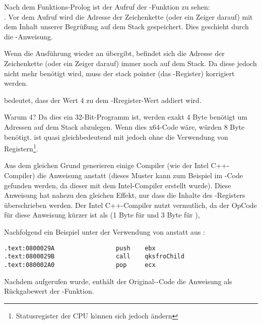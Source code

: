 Nach dem Funktions-Prolog ist der Aufruf der \printf{}-Funktion zu sehen:\\
.
Vor dem Aufruf wird die Adresse der Zeichenkette (oder ein Zeiger darauf) mit dem Inhalt unserer Begrüßung
auf dem Stack gespeichert. Dies geschieht durch die \PUSH-Anweisung.

Wenn \printf die Ausführung wieder an \main übergibt, befindet sich die Adresse der Zeichenkette (oder ein Zeiger darauf) immer noch auf dem Stack.
Da diese jedoch nicht mehr benötigt wird, muss der \gls{stack pointer} (das \ESP-Register) korrigiert werden.

 bedeutet, dass der Wert 4 zu dem \ESP-Rregister-Wert addiert wird.

Warum 4? Da dies ein 32-Bit-Programm ist, werden exakt 4 Byte benötigt um Adressen auf dem Stack abzulegen. Wenn dies x64-Code wäre, würden 8 Byte benötigt.
 ist quasi gleichbedeutend mit  jedoch ohne die Verwendung von Registern\footnote{Statusregister der CPU können sich jedoch ändern}.

\myindex{\oracle}

Aus dem gleichen Grund generieren einige Compiler (wie der Intel C++-Compiler) die Anweisung 
anstatt \ADD (dieses Muster kann zum Beispiel im \oracle{}-Code gefunden werden, da dieser mit dem Intel-Compiler erstellt wurde).
Diese Anweisung hat nahezu den gleichen Effekt, nur dass die Inhalte des \ECX-Registers überschrieben werden.
Der Intel C++-Compiler nutzt  vermutlich, da der OpCode für diese Anweisung kürzer ist als  (1 Byte für  und 3 Byte für ),

Nachfolgend ein Beispiel unter der Verwendung von \POP anstatt \ADD aus \oracle{}:

\begin{lstlisting}[caption=\oracle 10.2 Linux (app.o file),style=customasmx86]
.text:0800029A                 push    ebx
.text:0800029B                 call    qksfroChild
.text:080002A0                 pop     ecx
\end{lstlisting}

Nachdem \printf aufgerufen wurde, enthält der Original-\CCpp-Code die Anweisung  als Rückgabewert der \main-Funktion.

